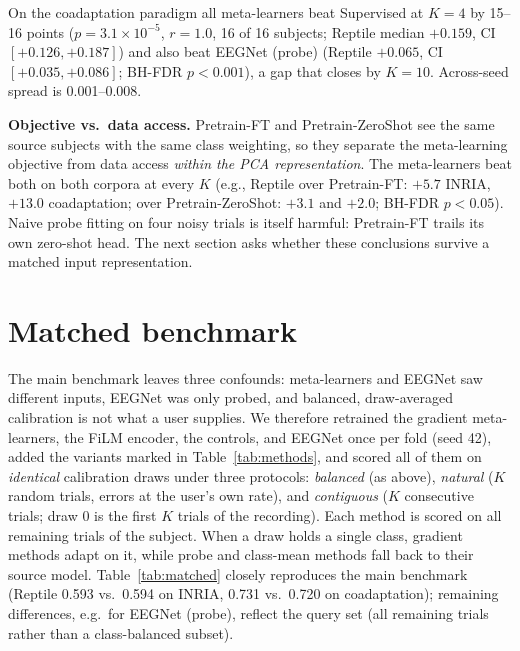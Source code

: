 \documentclass[conference,a4paper]{IEEEtran}
\begin{document}
On the coadaptation paradigm all meta-learners beat Supervised at $K{=}4$ by 15--16
points ($p=3.1\times10^{-5}$, $r=1.0$, 16 of 16 subjects; Reptile median $+0.159$,
CI $[+0.126,+0.187]$) and also beat EEGNet (probe) (Reptile $+0.065$, CI
$[+0.035,+0.086]$; BH-FDR $p<0.001$), a gap that closes by $K{=}10$. Across-seed
spread is 0.001--0.008.

\textbf{Objective vs.\ data access.} Pretrain-FT and Pretrain-ZeroShot see the same
source subjects with the same class weighting, so they separate the meta-learning
objective from data access \emph{within the PCA representation}. The meta-learners beat
both on both corpora at every $K$ (e.g., Reptile over Pretrain-FT: $+5.7$ INRIA,
$+13.0$ coadaptation; over Pretrain-ZeroShot: $+3.1$ and $+2.0$; BH-FDR $p<0.05$).
Naive probe fitting on four noisy trials is itself harmful: Pretrain-FT trails its own
zero-shot head. The next section asks whether these conclusions survive a matched
input representation.

\section{Matched benchmark}
\label{sec:matched}
The main benchmark leaves three confounds: meta-learners and EEGNet saw different
inputs, EEGNet was only probed, and balanced, draw-averaged calibration is not what a
user supplies. We therefore retrained the gradient meta-learners, the FiLM encoder, the controls, and EEGNet once per fold (seed 42), added the variants marked in Table~\ref{tab:methods}, and scored all of them on \emph{identical} calibration draws under three protocols:
\emph{balanced} (as above), \emph{natural} ($K$ random trials, errors at the user's own
rate), and \emph{contiguous} ($K$ consecutive trials; draw 0 is the first $K$ trials
of the recording). Each method is scored on all remaining trials of the subject. When
a draw holds a single class, gradient methods adapt on it, while probe and
class-mean methods fall back to their source model. Table~\ref{tab:matched} closely reproduces the main benchmark (Reptile 0.593 vs.\ 0.594 on INRIA, 0.731 vs.\ 0.720 on coadaptation); remaining differences, e.g.\ for EEGNet (probe), reflect the query set (all remaining trials rather than a class-balanced subset).
\end{document}
